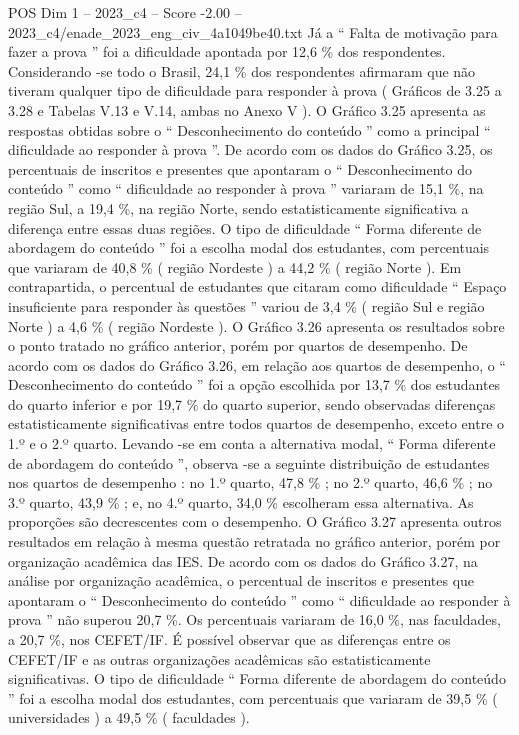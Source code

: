 \begin{textsample}{POS Dim 1 – 2023\_c4 – Score -2.00 – 2023\_c4/enade\_2023\_eng\_civ\_4a1049be40.txt}
Já a “ Falta de motivação para fazer a prova ” foi a dificuldade apontada por 12,6 \% dos respondentes.
Considerando -se todo o Brasil, 24,1 \% dos respondentes afirmaram que não tiveram qualquer tipo de dificuldade para responder à prova ( Gráficos de 3.25 a 3.28 e Tabelas V.13 e V.14, ambas no Anexo V ).
O Gráfico 3.25 apresenta as respostas obtidas sobre o “ Desconhecimento do conteúdo ” como a principal “ dificuldade ao responder à prova ”.
De acordo com os dados do Gráfico 3.25, os percentuais de inscritos e presentes que apontaram o “ Desconhecimento do conteúdo ” como “ dificuldade ao responder à prova ” variaram de 15,1 \%, na região Sul, a 19,4 \%, na região Norte, sendo estatisticamente significativa a diferença entre essas duas regiões.
O tipo de dificuldade “ Forma diferente de abordagem do conteúdo ” foi a escolha modal dos estudantes, com percentuais que variaram de 40,8 \% ( região Nordeste ) a 44,2 \% ( região Norte ).
Em contrapartida, o percentual de estudantes que citaram como dificuldade “ Espaço insuficiente para responder às questões ” variou de 3,4 \% ( região Sul e região Norte ) a 4,6 \% ( região Nordeste ).
O Gráfico 3.26 apresenta os resultados sobre o ponto tratado no gráfico anterior, porém por quartos de desempenho.
De acordo com os dados do Gráfico 3.26, em relação aos quartos de desempenho, o “ Desconhecimento do conteúdo ” foi a opção escolhida por 13,7 \% dos estudantes do quarto inferior e por 19,7 \% do quarto superior, sendo observadas diferenças estatisticamente significativas entre todos quartos de desempenho, exceto entre o 1.º e o 2.º quarto.
Levando -se em conta a alternativa modal, “ Forma diferente de abordagem do conteúdo ”, observa -se a seguinte distribuição de estudantes nos quartos de desempenho : no 1.º quarto, 47,8 \% ; no 2.º quarto, 46,6 \% ; no 3.º quarto, 43,9 \% ; e, no 4.º quarto, 34,0 \% escolheram essa alternativa.
As proporções são decrescentes com o desempenho.
O Gráfico 3.27 apresenta outros resultados em relação à mesma questão retratada no gráfico anterior, porém por organização acadêmica das IES.
De acordo com os dados do Gráfico 3.27, na análise por organização acadêmica, o percentual de inscritos e presentes que apontaram o “ Desconhecimento do conteúdo ” como “ dificuldade ao responder à prova ” não superou 20,7 \%.
Os percentuais variaram de 16,0 \%, nas faculdades, a 20,7 \%, nos CEFET/IF.
É possível observar que as diferenças entre os CEFET/IF e as outras organizações acadêmicas são estatisticamente significativas.
O tipo de dificuldade “ Forma diferente de abordagem do conteúdo ” foi a escolha modal dos estudantes, com percentuais que variaram de 39,5 \% ( universidades ) a 49,5 \% ( faculdades ).

\end{textsample}

